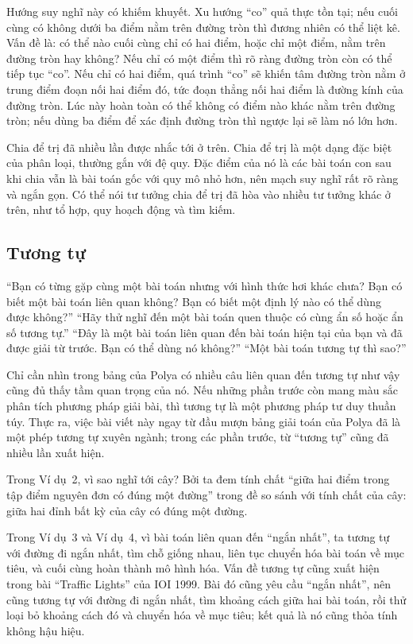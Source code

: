 \documentclass[11pt]{article}
\begin{document}
Hướng suy nghĩ này có khiếm khuyết. Xu hướng ``co'' quả thực tồn tại; nếu cuối
cùng có không dưới ba điểm nằm trên đường tròn thì đương nhiên có thể liệt kê.
Vấn đề là: có thể nào cuối cùng chỉ có hai điểm, hoặc chỉ một điểm, nằm trên
đường tròn hay không? Nếu chỉ có một điểm thì rõ ràng đường tròn còn có thể
tiếp tục ``co''. Nếu chỉ có hai điểm, quá trình ``co'' sẽ khiến tâm đường tròn
nằm ở trung điểm đoạn nối hai điểm đó, tức đoạn thẳng nối hai điểm là đường
kính của đường tròn. Lúc này hoàn toàn có thể không có điểm nào khác nằm trên
đường tròn; nếu dùng ba điểm để xác định đường tròn thì ngược lại sẽ làm nó
lớn hơn.

Chia để trị đã nhiều lần được nhắc tới ở trên. Chia để trị là một dạng đặc
biệt của phân loại, thường gắn với đệ quy. Đặc điểm của nó là các bài toán con
sau khi chia vẫn là bài toán gốc với quy mô nhỏ hơn, nên mạch suy nghĩ rất rõ
ràng và ngắn gọn. Có thể nói tư tưởng chia để trị đã hòa vào nhiều tư tưởng
khác ở trên, như tổ hợp, quy hoạch động và tìm kiếm.

\subsection{Tương tự}

``Bạn có từng gặp cùng một bài toán nhưng với hình thức hơi khác chưa? Bạn có
biết một bài toán liên quan không? Bạn có biết một định lý nào có thể dùng
được không?'' ``Hãy thử nghĩ đến một bài toán quen thuộc có cùng ẩn số hoặc ẩn
số tương tự.'' ``Đây là một bài toán liên quan đến bài toán hiện tại của bạn
và đã được giải từ trước. Bạn có thể dùng nó không?'' ``Một bài toán tương tự
thì sao?''

Chỉ cần nhìn trong bảng của Polya có nhiều câu liên quan đến tương tự như vậy
cũng đủ thấy tầm quan trọng của nó. Nếu những phần trước còn mang màu sắc phân
tích phương pháp giải bài, thì tương tự là một phương pháp tư duy thuần túy.
Thực ra, việc bài viết này ngay từ đầu mượn bảng giải toán của Polya đã là một
phép tương tự xuyên ngành; trong các phần trước, từ ``tương tự'' cũng đã nhiều
lần xuất hiện.

Trong Ví dụ~2, vì sao nghĩ tới cây? Bởi ta đem tính chất ``giữa hai điểm trong
tập điểm nguyên đơn có đúng một đường'' trong đề so sánh với tính chất của
cây: giữa hai đỉnh bất kỳ của cây có đúng một đường.

Trong Ví dụ~3 và Ví dụ~4, vì bài toán liên quan đến ``ngắn nhất'', ta tương tự
với đường đi ngắn nhất, tìm chỗ giống nhau, liên tục chuyển hóa bài toán về
mục tiêu, và cuối cùng hoàn thành mô hình hóa. Vấn đề tương tự cũng xuất hiện
trong bài ``Traffic Lights'' của IOI 1999. Bài đó cũng yêu cầu ``ngắn nhất'',
nên cũng tương tự với đường đi ngắn nhất, tìm khoảng cách giữa hai bài toán,
rồi thử loại bỏ khoảng cách đó và chuyển hóa về mục tiêu; kết quả là nó cũng
thỏa tính không hậu hiệu.
\end{document}
